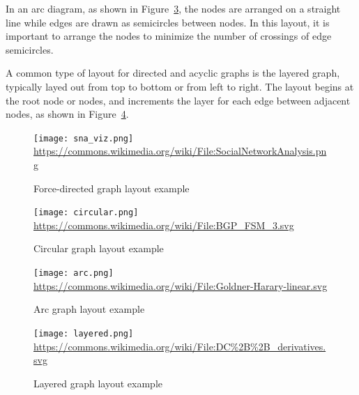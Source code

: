 In an arc diagram, as shown in Figure~\ref{fig:arc}, the nodes are arranged on a straight line while edges are drawn as semicircles between nodes. In this layout, it is important to arrange the nodes to minimize the number of crossings of edge semicircles. 

A common type of layout for directed and acyclic graphs is the layered graph, typically layed out from top to bottom or from left to right. The layout begins at the root node or nodes, and increments the layer for each edge between adjacent nodes, as shown in Figure~\ref{fig:layered}.

\begin{figure}
\centering
\texttt{[image: sna\_viz.png]} \\

\scriptsize \url{https://commons.wikimedia.org/wiki/File:SocialNetworkAnalysis.png}
\caption{Force-directed graph layout example} 
\label{fig:sna_viz}
\end{figure}

\begin{figure}
\centering
\texttt{[image: circular.png]} \\

\scriptsize \url{https://commons.wikimedia.org/wiki/File:BGP_FSM_3.svg}
\caption{Circular graph layout example} 
\label{fig:circular}
\end{figure}

\begin{figure}
\centering
\texttt{[image: arc.png]} \\

\scriptsize \url{https://commons.wikimedia.org/wiki/File:Goldner-Harary-linear.svg}
\caption{Arc graph layout example} 
\label{fig:arc}
\end{figure}

\begin{figure}
\centering
\texttt{[image: layered.png]} \\

\scriptsize \url{https://commons.wikimedia.org/wiki/File:DC\%2B\%2B\_derivatives.svg}
\caption{Layered graph layout example} 
\label{fig:layered}
\end{figure}


